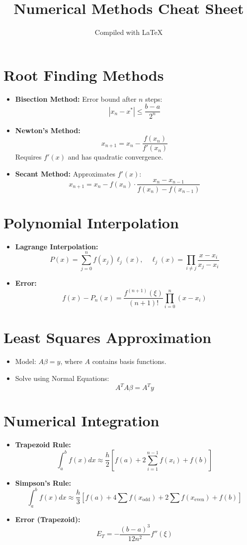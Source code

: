 \documentclass[11pt]{article}
\title{Numerical Methods Cheat Sheet}
\author{Compiled with \LaTeX}
\date{}
\begin{document}
\maketitle

\section*{Root Finding Methods}
\begin{itemize}
  \item \textbf{Bisection Method:} Error bound after $n$ steps:
  \[ |x_n - x^*| \leq \frac{b - a}{2^n} \]
  \item \textbf{Newton's Method:} 
  \[ x_{n+1} = x_n - \frac{f(x_n)}{f'(x_n)} \]
  Requires $f'(x)$ and has quadratic convergence.
  \item \textbf{Secant Method:} Approximates $f'(x)$:
  \[ x_{n+1} = x_n - f(x_n) \cdot \frac{x_n - x_{n-1}}{f(x_n) - f(x_{n-1})} \]
\end{itemize}

\section*{Polynomial Interpolation}
\begin{itemize}
  \item \textbf{Lagrange Interpolation:}
  \[ P(x) = \sum_{j=0}^{n} f(x_j) \ell_j(x), \quad \ell_j(x) = \prod_{i \ne j} \frac{x - x_i}{x_j - x_i} \]
  \item \textbf{Error:}
  \[ f(x) - P_n(x) = \frac{f^{(n+1)}(\xi)}{(n+1)!} \prod_{i=0}^{n}(x - x_i) \]
\end{itemize}

\section*{Least Squares Approximation}
\begin{itemize}
  \item Model: $A\beta = y$, where $A$ contains basis functions.
  \item Solve using Normal Equations:
  \[ A^T A \beta = A^T y \]
\end{itemize}

\section*{Numerical Integration}
\begin{itemize}
  \item \textbf{Trapezoid Rule:}
  \[ \int_a^b f(x) dx \approx \frac{h}{2} \left[f(a) + 2 \sum_{i=1}^{n-1} f(x_i) + f(b)\right] \]
  \item \textbf{Simpson's Rule:}
  \[ \int_a^b f(x) dx \approx \frac{h}{3} \left[f(a) + 4 \sum f(x_{\text{odd}}) + 2 \sum f(x_{\text{even}}) + f(b)\right] \]
  \item \textbf{Error (Trapezoid):}
  \[ E_T = -\frac{(b-a)^3}{12n^2} f''(\xi) \]
\end{itemize}
\end{document}
